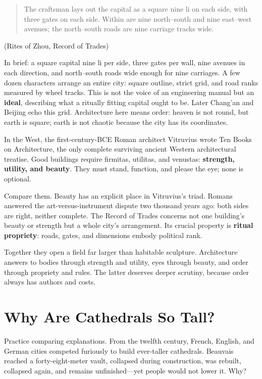 \begin{quote}
The craftsman lays out the capital as a square nine li on each side, with three gates on each side. Within are nine north--south and nine east--west avenues; the north--south roads are nine carriage tracks wide.
\end{quote}
(Rites of Zhou, Record of Trades)

In brief: a square capital nine li per side, three gates per wall, nine avenues in each direction, and north--south roads wide enough for nine carriages. A few dozen characters arrange an entire city: square outline, strict grid, and road ranks measured by wheel tracks. This is not the voice of an engineering manual but an \textbf{ideal}, describing what a ritually fitting capital ought to be. Later Chang'an and Beijing echo this grid. Architecture here means order: heaven is not round, but earth is square; earth is not chaotic because the city has its coordinates.

In the West, the first-century-BCE Roman architect Vitruvius wrote Ten Books on Architecture, the only complete surviving ancient Western architectural treatise. Good buildings require firmitas, utilitas, and venustas: \textbf{strength, utility, and beauty}. They must stand, function, and please the eye; none is optional.

Compare them. Beauty has an explicit place in Vitruvius's triad. Romans answered the art-versus-instrument dispute two thousand years ago: both sides are right, neither complete. The Record of Trades concerns not one building's beauty or strength but a whole city's arrangement. Its crucial property is \textbf{ritual propriety}: roads, gates, and dimensions embody political rank.

Together they open a field far larger than habitable sculpture. Architecture answers to bodies through strength and utility, eyes through beauty, and order through propriety and rules. The latter deserves deeper scrutiny, because order always has authors and costs.

\section{Why Are Cathedrals So Tall?}
Practice comparing explanations. From the twelfth century, French, English, and German cities competed furiously to build ever-taller cathedrals. Beauvais reached a forty-eight-meter vault, collapsed during construction, was rebuilt, collapsed again, and remains unfinished---yet people would not lower it. Why?

